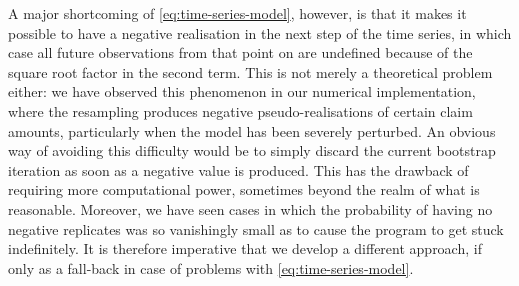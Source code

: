 \documentclass[a4paper]{book}
\begin{document}
A major shortcoming of \cref{eq:time-series-model}, however, is that it makes it possible to have a negative realisation in the next step of the time series, in which case all future observations from that point on are undefined because of the square root factor in the second term. This is not merely a theoretical problem either: we have observed this phenomenon in our numerical implementation, where the resampling produces negative pseudo-realisations of certain claim amounts, particularly when the model has been severely perturbed. An obvious way of avoiding this difficulty would be to simply discard the current bootstrap iteration as soon as a negative value is produced. This has the drawback of requiring more computational power, sometimes beyond the realm of what is reasonable. Moreover, we have seen cases in which the probability of having no negative replicates was so vanishingly small as to cause the program to get stuck indefinitely. It is therefore imperative that we develop a different approach, if only as a fall-back in case of problems with \cref{eq:time-series-model}.
\end{document}
